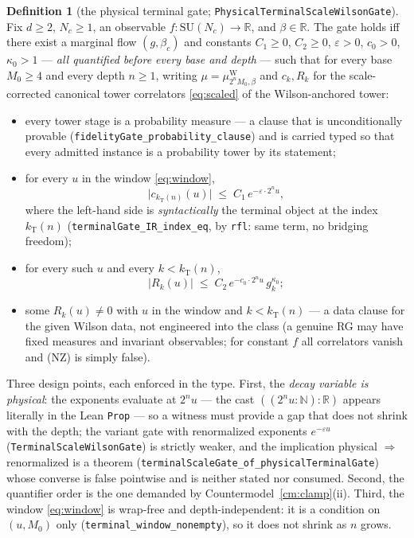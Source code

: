 \documentclass[11pt]{article}
\theoremstyle{definition}
\newtheorem{definition}[theorem]{Definition}
\newcommand{\lean}[1]{\texttt{#1}}
\newcommand{\SU}{\mathrm{SU}}
\newcommand{\muW}{\mu^{\mathrm{W}}}
\newcommand{\kT}{k_{\mathrm{T}}}
\begin{document}
\begin{definition}[the physical terminal gate;
\lean{PhysicalTerminalScaleWilsonGate}]\label{def:gate}
Fix $d \ge 2$, $N_c \ge 1$, an observable
$f : \SU(N_c) \to \mathbb{R}$, and $\beta \in \mathbb{R}$.  The gate
holds iff there exist a marginal flow $(g, \beta_c)$ and constants
$C_1 \ge 0$, $C_2 \ge 0$, $\varepsilon > 0$, $c_0 > 0$,
$\kappa_0 > 1$ --- \emph{all quantified before every base and depth}
--- such that for every base $M_0 \ge 4$ and every depth $n \ge 1$,
writing $\mu = \muW_{2^n M_0, \beta}$ and $c_k, R_k$ for the
scale-corrected canonical tower correlators \eqref{eq:scaled} of the
Wilson-anchored tower:
\begin{itemize}
\item[(P)] every tower stage is a probability measure --- a clause
that is unconditionally provable
(\lean{fidelityGate\_probability\_clause}) and is carried typed so
that every admitted instance is a probability tower by its statement;
\item[(IR)] for every $u$ in the window \eqref{eq:window},
\[
\bigl| c_{\kT(n)}(u) \bigr|
 \;\le\; C_1\, e^{-\varepsilon \cdot 2^n u} ,
\]
where the left-hand side is \emph{syntactically} the terminal object
at the index $\kT(n)$ (\lean{terminalGate\_IR\_index\_eq}, by
\lean{rfl}: same term, no bridging freedom);
\item[(UV)] for every such $u$ and every $k < \kT(n)$,
\[
\bigl| R_k(u) \bigr|
 \;\le\; C_2\, e^{-c_0 \cdot 2^n u}\, g_k^{\kappa_0} ;
\]
\item[(NZ)] some $R_k(u) \ne 0$ with $u$ in the window and
$k < \kT(n)$ --- a data clause for the given Wilson data, not
engineered into the class (a genuine RG may have fixed measures and
invariant observables; for constant $f$ all correlators vanish and
(NZ) is simply false).
\end{itemize}
\end{definition}

Three design points, each enforced in the type.  First, the
\emph{decay variable is physical}: the exponents evaluate at
$2^n u$ --- the cast $((2^n u : \mathbb{N}) : \mathbb{R})$ appears
literally in the Lean \lean{Prop} --- so a witness must provide a gap
that does not shrink with the depth; the variant gate with
renormalized exponents $e^{-\varepsilon u}$
(\lean{TerminalScaleWilsonGate}) is strictly weaker, and the
implication physical $\Rightarrow$ renormalized is a theorem
(\lean{terminalScaleGate\_of\_physicalTerminalGate}) whose converse is
false pointwise and is neither stated nor consumed.  Second, the
quantifier order is the one demanded by
Countermodel~\ref{cm:clamp}(ii).  Third, the window \eqref{eq:window}
is wrap-free and depth-independent: it is a condition on $(u, M_0)$
only (\lean{terminal\_window\_nonempty}), so it does not shrink as $n$
grows.
\end{document}

